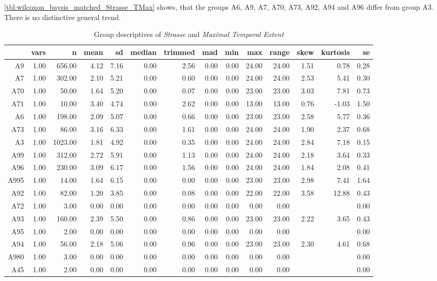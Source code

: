\cref{tbl:wilcoxon_baysis_matched_Strasse_TMax} shows, that the groups A6, A9, A7, A70, A73, A92, A94 and A96 differ from group A3. There is no distinctive general trend.
\begin{table}[ht!]
	\tiny
	\centering
  \begin{tabular}{rrrrrrrrrrrrrr}
    \hline
    & vars & n & mean & sd & median & trimmed & mad & min & max & range & skew & kurtosis & se \\ 
    \hline
    A9   & 1.00 & 656.00 & 4.12 & 7.16 & 0.00 & 2.56 & 0.00 & 0.00 & 24.00 & 24.00 & 1.51 & 0.78 & 0.28 \\ 
    A7   & 1.00 & 302.00 & 2.10 & 5.21 & 0.00 & 0.60 & 0.00 & 0.00 & 24.00 & 24.00 & 2.53 & 5.41 & 0.30 \\ 
    A70  & 1.00 & 50.00 & 1.64 & 5.20 & 0.00 & 0.07 & 0.00 & 0.00 & 23.00 & 23.00 & 3.03 & 7.81 & 0.73 \\ 
    A71  & 1.00 & 10.00 & 3.40 & 4.74 & 0.00 & 2.62 & 0.00 & 0.00 & 13.00 & 13.00 & 0.76 & -1.03 & 1.50 \\ 
    A6   & 1.00 & 198.00 & 2.09 & 5.07 & 0.00 & 0.66 & 0.00 & 0.00 & 23.00 & 23.00 & 2.58 & 5.77 & 0.36 \\ 
    A73  & 1.00 & 86.00 & 3.16 & 6.33 & 0.00 & 1.61 & 0.00 & 0.00 & 24.00 & 24.00 & 1.90 & 2.37 & 0.68 \\ 
    A3   & 1.00 & 1023.00 & 1.81 & 4.92 & 0.00 & 0.35 & 0.00 & 0.00 & 24.00 & 24.00 & 2.84 & 7.18 & 0.15 \\ 
    A99  & 1.00 & 312.00 & 2.72 & 5.91 & 0.00 & 1.13 & 0.00 & 0.00 & 24.00 & 24.00 & 2.18 & 3.64 & 0.33 \\ 
    A96  & 1.00 & 230.00 & 3.09 & 6.17 & 0.00 & 1.56 & 0.00 & 0.00 & 24.00 & 24.00 & 1.84 & 2.08 & 0.41 \\ 
    A995 & 1.00 & 14.00 & 1.64 & 6.15 & 0.00 & 0.00 & 0.00 & 0.00 & 23.00 & 23.00 & 2.98 & 7.41 & 1.64 \\ 
    A92  & 1.00 & 82.00 & 1.20 & 3.85 & 0.00 & 0.08 & 0.00 & 0.00 & 22.00 & 22.00 & 3.58 & 12.88 & 0.43 \\ 
    A72  & 1.00 & 3.00 & 0.00 & 0.00 & 0.00 & 0.00 & 0.00 & 0.00 & 0.00 & 0.00 &  &  & 0.00 \\ 
    A93  & 1.00 & 160.00 & 2.39 & 5.50 & 0.00 & 0.86 & 0.00 & 0.00 & 23.00 & 23.00 & 2.22 & 3.65 & 0.43 \\ 
    A95  & 1.00 & 2.00 & 0.00 & 0.00 & 0.00 & 0.00 & 0.00 & 0.00 & 0.00 & 0.00 &  &  & 0.00 \\ 
    A94  & 1.00 & 56.00 & 2.18 & 5.06 & 0.00 & 0.96 & 0.00 & 0.00 & 23.00 & 23.00 & 2.30 & 4.61 & 0.68 \\ 
    A980 & 1.00 & 3.00 & 0.00 & 0.00 & 0.00 & 0.00 & 0.00 & 0.00 & 0.00 & 0.00 &  &  & 0.00 \\ 
    A45  & 1.00 & 2.00 & 0.00 & 0.00 & 0.00 & 0.00 & 0.00 & 0.00 & 0.00 & 0.00 &  &  & 0.00 \\ 
    \hline
  \end{tabular}
	\caption{Group descriptives of \textit{Strasse} and \textit{Maximal Temporal Extent}}
	\label{tbl:descriptives_baysis_matched_Strasse_TMax}
\end{table}

